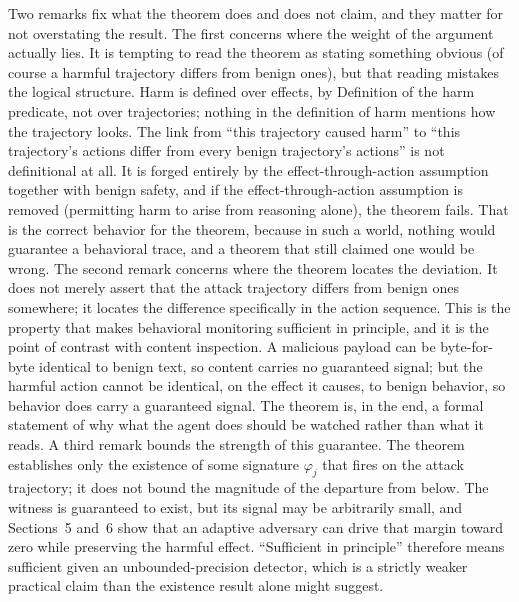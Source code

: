 \documentclass[journal]{IEEEtran}
\theoremstyle{remark}
\begin{document}
Two remarks fix what the theorem does and does not claim, and they matter for not overstating the result. The first concerns where the weight of the argument actually lies. It is tempting to read the theorem as stating something obvious (of course a harmful trajectory differs from benign ones), but that reading mistakes the logical structure. Harm is defined over effects, by Definition of the harm predicate, not over trajectories; nothing in the definition of harm mentions how the trajectory looks. The link from ``this trajectory caused harm'' to ``this trajectory's actions differ from every benign trajectory's actions'' is not definitional at all. It is forged entirely by the effect-through-action assumption together with benign safety, and if the effect-through-action assumption is removed (permitting harm to arise from reasoning alone), the theorem fails. That is the correct behavior for the theorem, because in such a world, nothing would guarantee a behavioral trace, and a theorem that still claimed one would be wrong. The second remark concerns where the theorem locates the deviation. It does not merely assert that the attack trajectory differs from benign ones somewhere; it locates the difference specifically in the action sequence. This is the property that makes behavioral monitoring sufficient in principle, and it is the point of contrast with content inspection. A malicious payload can be byte-for-byte identical to benign text, so content carries no guaranteed signal; but the harmful action cannot be identical, on the effect it causes, to benign behavior, so behavior does carry a guaranteed signal. The theorem is, in the end, a formal statement of why what the agent does should be watched rather than what it reads. A third remark bounds the strength of this guarantee. The theorem establishes only the existence of some signature $\varphi_j$ that fires on the attack trajectory; it does not bound the magnitude of the departure from below. The witness is guaranteed to exist, but its signal may be arbitrarily small, and Sections~5 and~6 show that an adaptive adversary can drive that margin toward zero while preserving the harmful effect. ``Sufficient in principle'' therefore means sufficient given an unbounded-precision detector, which is a strictly weaker practical claim than the existence result alone might suggest.
\end{document}
